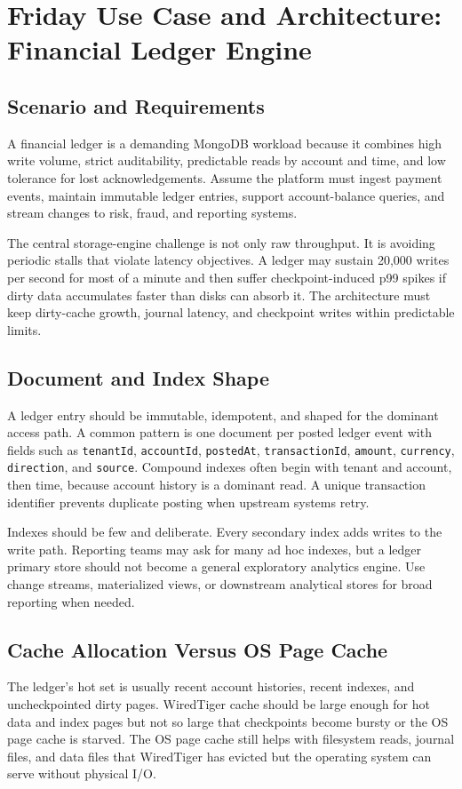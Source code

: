 \section{Friday Use Case and Architecture: Financial Ledger Engine}
\subsection{Scenario and Requirements}
A financial ledger is a demanding MongoDB workload because it combines high write volume, strict auditability, predictable reads by account and time, and low tolerance for lost acknowledgements. Assume the platform must ingest payment events, maintain immutable ledger entries, support account-balance queries, and stream changes to risk, fraud, and reporting systems.

The central storage-engine challenge is not only raw throughput. It is avoiding periodic stalls that violate latency objectives. A ledger may sustain 20,000 writes per second for most of a minute and then suffer checkpoint-induced p99 spikes if dirty data accumulates faster than disks can absorb it. The architecture must keep dirty-cache growth, journal latency, and checkpoint writes within predictable limits.

\subsection{Document and Index Shape}
A ledger entry should be immutable, idempotent, and shaped for the dominant access path. A common pattern is one document per posted ledger event with fields such as \texttt{tenantId}, \texttt{accountId}, \texttt{postedAt}, \texttt{transactionId}, \texttt{amount}, \texttt{currency}, \texttt{direction}, and \texttt{source}. Compound indexes often begin with tenant and account, then time, because account history is a dominant read. A unique transaction identifier prevents duplicate posting when upstream systems retry.

Indexes should be few and deliberate. Every secondary index adds writes to the write path. Reporting teams may ask for many ad hoc indexes, but a ledger primary store should not become a general exploratory analytics engine. Use change streams, materialized views, or downstream analytical stores for broad reporting when needed.

\subsection{Cache Allocation Versus OS Page Cache}
The ledger's hot set is usually recent account histories, recent indexes, and uncheckpointed dirty pages. WiredTiger cache should be large enough for hot data and index pages but not so large that checkpoints become bursty or the OS page cache is starved. The OS page cache still helps with filesystem reads, journal files, and data files that WiredTiger has evicted but the operating system can serve without physical I/O.

